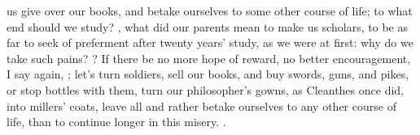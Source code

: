 us give over our books, and betake ourselves to some other course of life; to
what end should we study? , what did our parents mean to make us scholars, to be as far
to seek of preferment after twenty years' study, as we were at first: why do we
take such pains? ? If there
be no more hope of reward, no better encouragement, I say again, ; let's turn soldiers, sell our books,
and buy swords, guns, and pikes, or stop bottles with them, turn our
philosopher's gowns, as Cleanthes once did, into millers' coats, leave all and
rather betake ourselves to any other course of life, than to continue longer in
this misery. .

